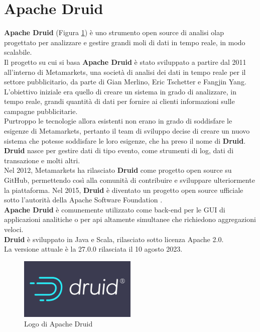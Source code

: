 \section{Apache Druid}
\textbf{Apache Druid} (Figura \ref{fig:logo_druid}) è uno strumento \gls{open source}{} di analisi \gls{olap}{} progettato per analizzare e gestire grandi moli di dati in tempo reale, in modo scalabile. \\
Il progetto su cui si basa \textbf{Apache Druid} è stato sviluppato a partire dal 2011 all'interno di Metamarkets, una società di analisi dei dati in tempo reale per il settore pubblicitario,
da parte di Gian Merlino, Eric Tschetter e Fangjin Yang.\\
L'obiettivo iniziale era quello di creare un sistema in grado di analizzare, in tempo reale, grandi quantità di dati per fornire ai clienti 
informazioni sulle campagne pubblicitarie.\\
Purtroppo le tecnologie allora esistenti non erano in grado di soddisfare le esigenze di Metamarkets, pertanto il team di sviluppo decise di creare un nuovo sistema che potesse soddisfare le loro esigenze, che ha preso il nome di \textbf{Druid}.\\
\textbf{Druid} nasce per gestire dati di tipo evento, come strumenti di \gls{log}{}, dati di transazione e molti altri. \\
Nel 2012, Metamarkets ha rilasciato \textbf{Druid}{} come progetto \gls{open source}{} su GitHub, permettendo così alla comunità di contribuire e sviluppare ulteriormente la piattaforma. Nel 2015, \textbf{Druid} è diventato un progetto \gls{open source}{} ufficiale sotto l'autorità della \gls{Apache Software Foundation}{} \cite{site:Intro_Druid}.\\
\textbf{Apache Druid} è comunemente utilizzato come back-end per le GUI di applicazioni analitiche o
per \gls{api}{} altamente simultanee che richiedono aggregazioni veloci. \\
\textbf{Druid} è sviluppato in Java e Scala, rilasciato sotto licenza Apache 2.0. \\La versione attuale è la 27.0.0 rilasciata il 10 agosto 2023.\\
\begin{figure}[h]
    \centering
    \includegraphics[width=0.5\textwidth]{images/componenti/logo_druid.png}
    \caption{Logo di Apache Druid}
    \label{fig:logo_druid}
\end{figure}
\pagebreak
